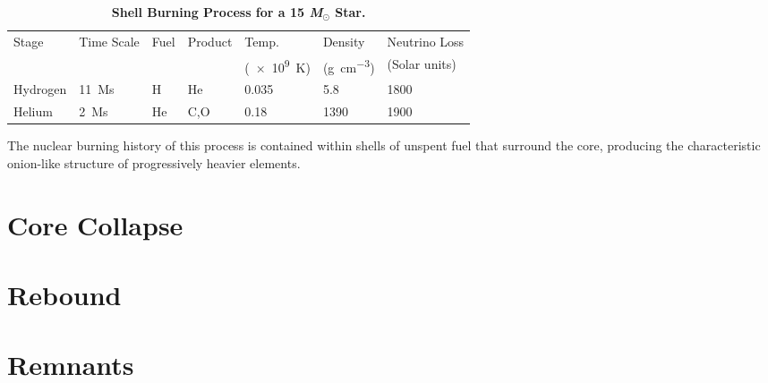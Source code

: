 		\begin{table}[H]
		\centering
		\caption[Shell Burning Process for a 15 \emph{M}$_\odot$ Star.]{\bf Shell Burning Process for a 15 \emph{M}$_\odot$ Star.\rm }
		\label{table:shell_burning}
			\begin{tabular}{lllllll}
				\toprule
				Stage & Time Scale & Fuel & Product & Temp. & Density & Neutrino Loss\\
				 & & & & (\SI{e9}{\kelvin}) & (\si{\gram\per\cubic\centi\metre}) & (Solar units) \\
				\midrule
				Hydrogen & \SI{11}{\mega\s} & H & He & 0.035 & 5.8 & 1800 \\
				Helium & \SI{2}{\mega\s} & He & C,O & 0.18 & 1390 & 1900 \\
				\bottomrule
			\end{tabular}
	\end{table}

		The nuclear burning history of this process is contained within shells of unspent fuel that surround the core, producing the characteristic onion-like structure of progressively heavier elements.  
	\section{Core Collapse}
		\filler
	\section{Rebound}
		\filler
	\section{Remnants}
		\filler


